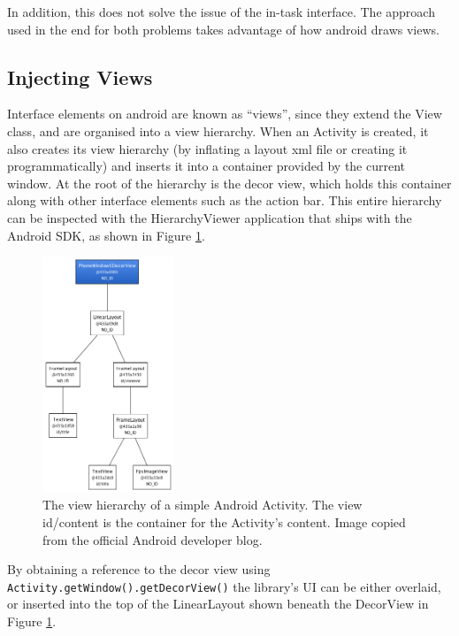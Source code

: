 In addition, this does not solve the issue of the in-task interface.
The approach used in the end for both problems takes advantage of
how android draws views.

\subsection{Injecting Views}

Interface elements on android are known as ``views'', since they
extend the View class, and are organised into a view hierarchy.
When an Activity is created, it also creates its view hierarchy
(by inflating a layout xml file or creating it programmatically)
and inserts it into a container provided by the current window.
At the root of the hierarchy is the decor view, which holds this
container along with other interface elements such as the action
bar. This entire hierarchy can be inspected with the HierarchyViewer
application that ships with the Android SDK, as shown in Figure
\ref{fig:view-hierarchy}.

\begin{figure}
  \centering
  \includegraphics[width=0.35\textwidth]{images/view-hierarchy}
  \caption{The view hierarchy of a simple Android Activity. The
           view id/content is the container for the Activity's
           content. Image copied from the official Android 
           developer blog.}
  \label{fig:view-hierarchy}
\end{figure}

By obtaining a reference to the decor view using 
\verb/Activity.getWindow().getDecorView()/ the library's UI can
be either overlaid, or inserted into the top of the LinearLayout
shown beneath the DecorView in Figure \ref{fig:view-hierarchy}.

